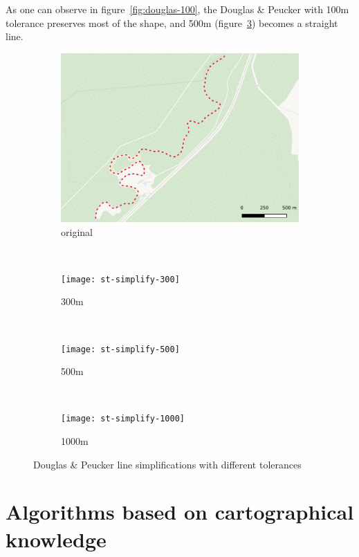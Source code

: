 \documentclass{article}
\begin{document}
As one can observe in figure~\ref{fig:douglas-100}, the Douglas \& Peucker with
100m tolerance preserves most of the shape, and 500m
(figure~\ref{fig:douglas-500}) becomes a straight line.

\begin{figure}
    \centering
    \begin{subfigure}[b]{0.23\textwidth}
        \includegraphics[width=\textwidth]{zeimena}
        \caption{original}
        \label{fig:zeimena-original}
    \end{subfigure}
    ~
    \begin{subfigure}[b]{0.23\textwidth}
        \texttt{[image: st-simplify-300]}
        \caption{300m}
        \label{fig:douglas-300}
    \end{subfigure}
    ~
    \begin{subfigure}[b]{0.23\textwidth}
        \texttt{[image: st-simplify-500]}
        \caption{500m}
        \label{fig:douglas-500}
    \end{subfigure}
    ~
    \begin{subfigure}[b]{0.23\textwidth}
        \texttt{[image: st-simplify-1000]}
        \caption{1000m}
        \label{fig:douglas-1000}
    \end{subfigure}
    \caption{Douglas \& Peucker line simplifications with different tolerances}
    \label{fig:douglas-peucker}
\end{figure}

\section{Algorithms based on cartographical knowledge}
\end{document}
